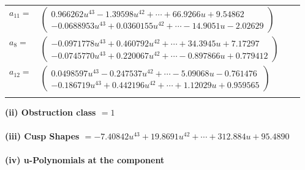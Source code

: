 \documentclass[1p]{elsarticle_modified}
\theoremstyle{definition}
\begin{document}
\begin{tabular}{m{7pt} m{180pt} m{7pt} m{180pt} }
\flushright $a_{11}=$&$\begin{pmatrix}0.966262 u^{43}-1.39598 u^{42}+\cdots+66.9266 u+9.54862\\-0.0688953 u^{43}+0.0360155 u^{42}+\cdots-14.9051 u-2.02629\end{pmatrix}$ \\
\flushright $a_{8}=$&$\begin{pmatrix}-0.0971778 u^{43}+0.460792 u^{42}+\cdots+34.3945 u+7.17297\\-0.0745770 u^{43}+0.220067 u^{42}+\cdots-0.897866 u+0.779412\end{pmatrix}$ \\
\flushright $a_{12}=$&$\begin{pmatrix}0.0498597 u^{43}-0.247537 u^{42}+\cdots-5.09068 u-0.761476\\-0.186719 u^{43}+0.442196 u^{42}+\cdots+1.12029 u+0.959565\end{pmatrix}$\\&\end{tabular}
\flushleft \textbf{(ii) Obstruction class $= 1$}\\~\\
\flushleft \textbf{(iii) Cusp Shapes $= -7.40842 u^{43}+19.8691 u^{42}+\cdots+312.884 u+95.4890$}\\~\\
\newpage\renewcommand{\arraystretch}{1}
\flushleft \textbf{(iv) u-Polynomials at the component}\newline \\
\end{document}
